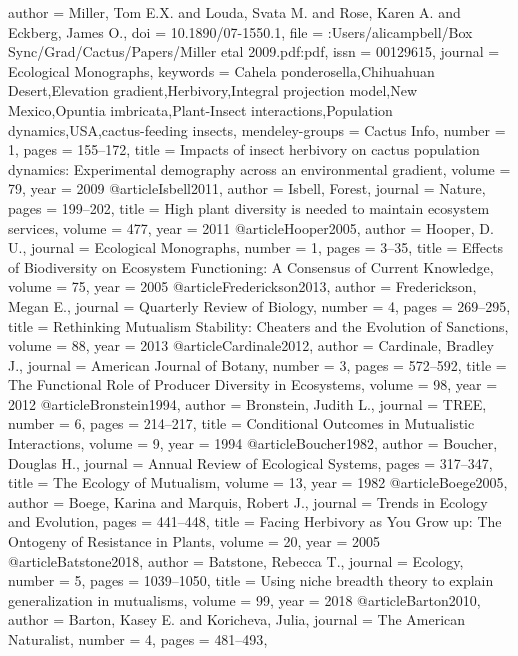 {{author = {Miller, Tom E.X. and Louda, Svata M. and Rose, Karen A. and Eckberg, James O.},
doi = {10.1890/07-1550.1},
file = {:Users/alicampbell/Box Sync/Grad/Cactus/Papers/Miller etal 2009.pdf:pdf},
issn = {00129615},
journal = {Ecological Monographs},
keywords = {Cahela ponderosella,Chihuahuan Desert,Elevation gradient,Herbivory,Integral projection model,New Mexico,Opuntia imbricata,Plant-Insect interactions,Population dynamics,USA,cactus-feeding insects},
mendeley-groups = {Cactus Info},
number = {1},
pages = {155--172},
title = {{Impacts of insect herbivory on cactus population dynamics: Experimental demography across an environmental gradient}},
volume = {79},
year = {2009}
}
@article{Isbell2011,
author = {Isbell, Forest},
journal = {Nature},
pages = {199--202},
title = {{High plant diversity is needed to maintain ecosystem services}},
volume = {477},
year = {2011}
}
@article{Hooper2005,
author = {Hooper, D. U.},
journal = {Ecological Monographs},
number = {1},
pages = {3--35},
title = {{Effects of Biodiversity on Ecosystem Functioning: A Consensus of Current Knowledge}},
volume = {75},
year = {2005}
}
@article{Frederickson2013,
author = {Frederickson, Megan E.},
journal = {Quarterly Review of Biology},
number = {4},
pages = {269--295},
title = {{Rethinking Mutualism Stability: Cheaters and the Evolution of Sanctions}},
volume = {88},
year = {2013}
}
@article{Cardinale2012,
author = {Cardinale, Bradley J.},
journal = {American Journal of Botany},
number = {3},
pages = {572--592},
title = {{The Functional Role of Producer Diversity in Ecosystems}},
volume = {98},
year = {2012}
}
@article{Bronstein1994,
author = {Bronstein, Judith L.},
journal = {TREE},
number = {6},
pages = {214--217},
title = {{Conditional Outcomes in Mutualistic Interactions}},
volume = {9},
year = {1994}
}
@article{Boucher1982,
author = {Boucher, Douglas H.},
journal = {Annual Review of Ecological Systems},
pages = {317--347},
title = {{The Ecology of Mutualism}},
volume = {13},
year = {1982}
}
@article{Boege2005,
author = {Boege, Karina and Marquis, Robert J.},
journal = {Trends in Ecology and Evolution},
pages = {441--448},
title = {{Facing Herbivory as You Grow up: The Ontogeny of Resistance in Plants}},
volume = {20},
year = {2005}
}
@article{Batstone2018,
author = {Batstone, Rebecca T.},
journal = {Ecology},
number = {5},
pages = {1039--1050},
title = {{Using niche breadth theory to explain generalization in mutualisms}},
volume = {99},
year = {2018}
}
@article{Barton2010,
author = {Barton, Kasey E. and Koricheva, Julia},
journal = {The American Naturalist},
number = {4},
pages = {481--493},
}}
